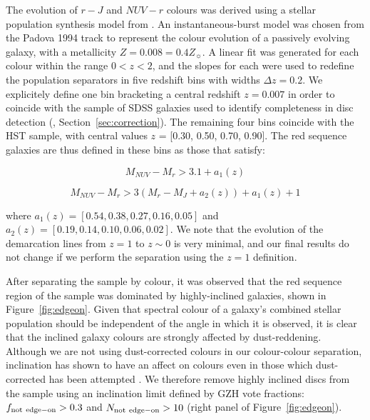 \documentclass[useAMS,usenatbib]{mn2e}
\begin{document}
The evolution of $r-J$ and $NUV-r$ colours was derived using a stellar population synthesis model from \citet{Bruzual2003}. An instantaneous-burst model was chosen from the Padova 1994 track to represent the colour evolution of a passively evolving galaxy, with a metallicity $Z=0.008=0.4Z_{\sun}$. A linear fit was generated for each colour within the range $0<z<2$, and the slopes for each were used to redefine the population separators in five redshift bins with widths $\Delta z=0.2$. We explicitely define one bin bracketing a central redshift $z=0.007$ in order to coincide with the sample of SDSS galaxies used to identify completeness in disc detection (, Section~\ref{sec:correction}). The remaining four bins coincide with the HST sample, with central values $z$ = [0.30, 0.50, 0.70, 0.90]. The red sequence galaxies are thus defined in these bins as those that satisfy:

\begin{equation}
M_{NUV}-M_{r} > 3.1 + a_{1}(z)
\end{equation}

\begin{equation}
M_{NUV}-M_{r} > 3(M_{r}-M_{J} + a_{2}(z))+ a_{1}(z) + 1  
\end{equation}

\noindent where $a_{1}(z) = [0.54,0.38,0.27,0.16,0.05]$ and $a_{2}(z) = [0.19,0.14,0.10,0.06,0.02]$. 
We note that the evolution of the demarcation lines from $z=1$ to $z\sim0$ is very minimal, and our final results do not change if we perform the separation using the $z=1$ definition.

After separating the sample by colour, it was observed that the red sequence region of the sample was dominated by highly-inclined galaxies, shown in Figure~\ref{fig:edgeon}. Given that spectral colour of a galaxy's combined stellar population should be independent of the angle in which it is observed, it is clear that the inclined galaxy colours are strongly affected by dust-reddening. Although we are not using dust-corrected colours in our colour-colour separation, inclination has shown to have an affect on colours even in those which dust-corrected has been attempted \citep{Morselli2016a,Devour2017}. We therefore remove highly inclined discs from the sample using an inclination limit defined by GZH vote fractions: $f_{\rm not~edge-on} > 0.3$ and $N_{\rm not~edge-on}>10$ (right panel of Figure~\ref{fig:edgeon}).  
\end{document}
